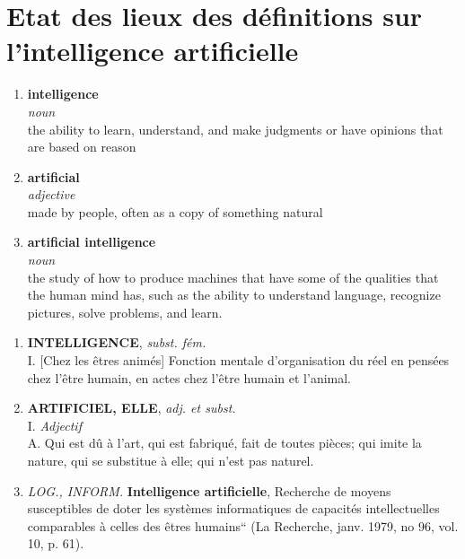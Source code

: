 \section{Etat des lieux des définitions sur l'intelligence artificielle}\label{appendice:definition-ia}

\begin{tcolorbox}[title= définitions anglaises du Cambridge dictionary]
\begin{enumerate}
    \item {\textbf{intelligence} \\
\textit{noun} \\
the ability to learn, understand, and make judgments or have opinions that are based on reason}
    \item {
    \textbf{artificial} \\
\textit{adjective}\\
made by people, often as a copy of something natural
    }
    \item  {
    \textbf{artificial intelligence}\\
    \textit{noun}\\
the study of how to produce machines that have some of the qualities that the human mind has, such as the ability to understand language, recognize pictures, solve problems, and learn.
    }
\end{enumerate}





\end{tcolorbox}


\begin{tcolorbox}[title= Définitions françaises du dictionnaire ATILF]
\begin{enumerate}
    \item {\textbf{INTELLIGENCE}, \textit{subst. fém.}\\
I. [Chez les êtres animés] Fonction mentale d'organisation du réel en pensées chez l'être humain, en actes chez l'être humain et l'animal.
}
    \item {\textbf{ARTIFICIEL, ELLE}, \textit{adj. et subst.} \\
I. \textit{Adjectif} \\
A. Qui est dû à l'art, qui est fabriqué, fait de toutes pièces; qui imite la nature, qui se substitue à elle; qui n'est pas naturel.
}
    \item {
\textit{LOG., INFORM.} \textbf{Intelligence artificielle}, Recherche de moyens susceptibles de doter les systèmes informatiques de capacités intellectuelles comparables à celles des êtres humains`` (La Recherche, janv. 1979, no 96, vol. 10, p. 61).
}
\end{enumerate}



\end{tcolorbox}



